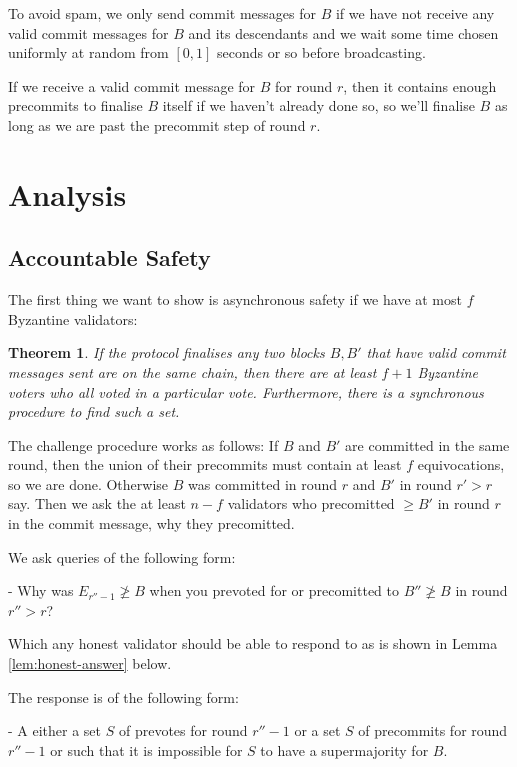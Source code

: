 \documentclass{article}
\newtheorem{theorem}{Theorem}[section]
\begin{document}
{To avoid spam, we only send commit messages for $B$ if we have not receive any valid commit messages for $B$ and its descendants and we wait some time chosen uniformly at random from $[0,1]$ seconds or so before broadcasting.

If we receive a valid commit message for $B$ for round $r$, then it contains enough precommits to finalise $B$ itself if we haven't already done so, so we'll finalise $B$ as long as we are past the precommit step of round $r$.

\section{ Analysis }

\subsection{ Accountable Safety}

The first thing we want to show is asynchronous safety if we have at most $f$ Byzantine validators:

\begin{theorem} If the protocol finalises any two blocks $B,B'$ that have valid commit messages sent are on the same chain, then there are at least $f+1$ Byzantine voters who all voted in a particular vote. Furthermore, there is a synchronous procedure to find such a set.
\end{theorem}

The challenge procedure works as follows: If $B$ and $B'$ are committed in the same round, then the union of their precommits must contain at least $f$ equivocations, so we are done. Otherwise $B$ was committed in round $r$ and $B'$ in round $r' > r$ say. Then we ask the at least $n-f$ validators who precomitted $\geq B'$ in round $r$ in the commit message, why they precomitted.

We ask queries of the following form: 

- Why was $E_{r''-1} \not\geq B$  when you prevoted for or precomitted to $B'' \not\geq B$ in round $r'' > r$?

Which any honest validator should be able to respond to as is shown in Lemma \ref{lem:honest-answer} below. 

The response is of the following form:

- A either a set $S$ of prevotes for round $r''-1$ or a set $S$ of precommits for round $r''-1$  or  such that it is impossible for $S$ to have a supermajority for $B$.

}
\end{document}

